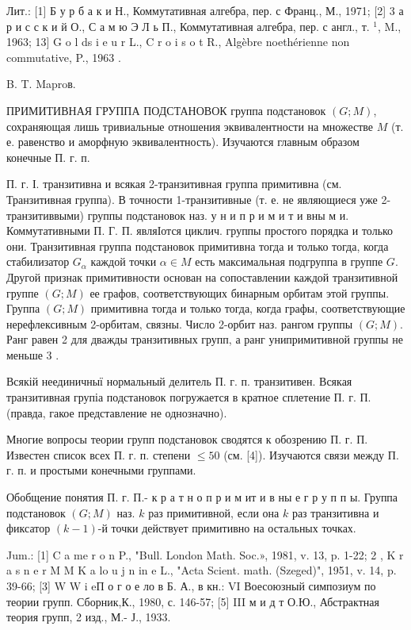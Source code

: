 \documentclass[10pt]{article}
\begin{document}
Лит.: [1] Б у р б а к и Н., Коммутативная алгебра, пер. с Франц., М., 1971; [2] 3 а р и с с к и й О., С а м ю Э Л ь П., Коммутативная алгебра, пер. с англ., т. ${ }^{1}$, M., 1963; 13] G o l ds i e u r L., C r o i s o t R., Algèbre noethérienne non commutative, P., 1963 .



B. T. Maproв.



ПРИМИТИВНАЯ ГРУППА ПОДСТАНОВОК группа подстановок $(G ; M)$, сохраняющая лишь тривиальные отношения эквивалентности на множестве $M$ (т. е. равенство и аморфную эквивалентность). Изучаются главным образом конечные П. г. п.



П. г. І. транзитивна и всякая 2-транзитивная группа примитивна (см. Транзитивная группа). В точности 1-транзитивные (т. е. не являющиеся уже 2-транзитиввыми) группы подстановок наз. у н и п р и м и т и вны м и. Коммутативными П. Г. П. являІотся циклич. группы простого порядка и только они. Транзитивная группа подстановок примитивна тогда и только тогда, когда стабилизатор $G_{\alpha}$ каждой точки $\alpha \in M$ есть максимальная подгруппа в группе $G$. Другой признак примитивности основан на сопоставлении каждой транзитивной группе $(G ; M)$ ее графов, соответствующих бинарным орбитам этой группы. Группа $(G ; M)$ примитивна тогда и только тогда, когда графы, соответствующие нерефлексивным 2-орбитам, связны. Число 2-орбит наз. рангом группы $(G ; M)$. Ранг равен 2 для дважды транзитивных групп, а ранг унипримитивной группы не меньше 3 .



Всякій неединичныї нормальный делитель П. г. п. транзитивен. Всякая транзитивная групіа подстановок погружается в кратное сплетение П. г. П. (правда, гакое представление не однозначно).



Многие вопросы теории групп подстановок сводятся к обозрению П. г. П. Известен список всех П. г. п. степени $\leqslant 50$ (см. [4]). Изучаются связи между П. г. п. и простыми конечными группами.



Обобщение понятия П. г. П.- к р а т н о п р и м ит и в ны е г р у п п ы. Группа подстановок $(G ; M)$ наз. $k$ раз примитивной, если она $k$ раз транзитивна и фиксатор $(k-1)$-й точки действует примитивно на остальных точках.



Jum.: [1] C a me r o n P., "Bull. London Math. Soc.», 1981, v. 13, p. 1-22; 2 , K r a s n e r M M K a lo u j n in e L., "Acta Scient. math. (Szeged)", 1951, v. 14, p. 39-66; [3] W W i eП о г о е ло в Б. А., в кн.: VI Воесоюзный симпозиум по теории групп. Сборник,К., 1980, с. 146-57; [5] III м и д т О.Ю., Абстрактная теория групп, 2 изд., М.- Ј., 1933.
\end{document}
